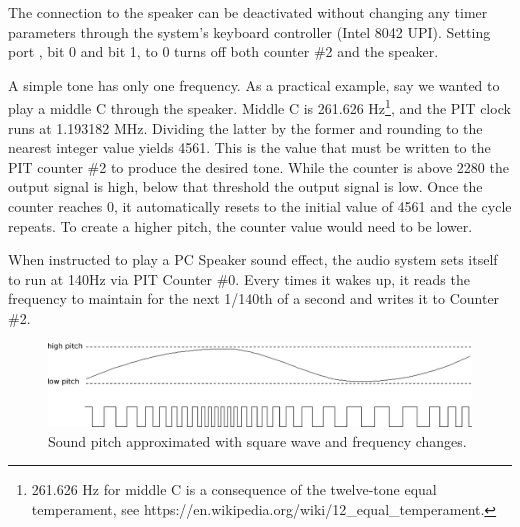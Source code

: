 \documentclass[book.tex]{subfiles}
\begin{document}
\par
The connection to the speaker can be deactivated without changing any timer parameters through the system's keyboard controller (Intel 8042 UPI). Setting port , bit 0 and bit 1, to 0 turns off both counter \#2 and the speaker.\\

\par
\begin{minipage}{\textwidth}

\end{minipage}

\par
A simple tone has only one frequency. As a practical example, say we wanted to play a middle C through the speaker. Middle C is 261.626 Hz\footnote{261.626 Hz for middle C is a consequence of the twelve-tone equal temperament, see https://en.wikipedia.org/wiki/12\_equal\_temperament.}, and the PIT clock runs at 1.193182 MHz. Dividing the latter by the former and rounding to the nearest integer value yields 4561. This is the value that must be written to the PIT counter \#2 to produce the desired tone. While the counter is above 2280 the output signal is high, below that threshold the output signal is low. Once the counter reaches 0, it automatically resets to the initial value of 4561 and the cycle repeats. To create a higher pitch, the counter value would need to be lower. \\

\par
When instructed to play a PC Speaker sound effect, the audio system sets itself to run at 140Hz via PIT Counter \#0. Every times it wakes up, it reads the frequency to maintain for the next 1/140th of a second and writes it to Counter \#2.\\

\par
\begin{figure}[H]
  \centering
  \includegraphics[width=\textwidth]{imgs/drawings/square_waves.eps}
  \caption{Sound pitch approximated with square wave and frequency changes.}
\end{figure}
\end{document}
